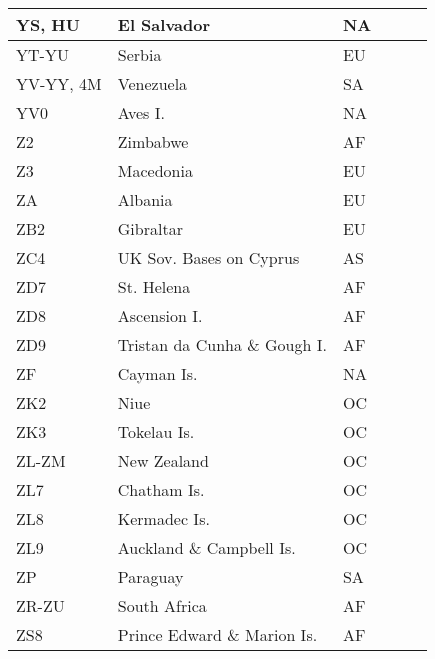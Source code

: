\documentclass[a4paper]{article}
\begin{document}
\begin{longtable}{|p{1.5cm}|p{4cm}|l|p{2cm}|p{2cm}|p{2cm}|}
\hline
YS, HU                 & El Salvador                                & NA    & & & \\
\hline
YT-YU                  & Serbia                                     & EU    & & & \\
\hline
YV-YY, 4M              & Venezuela                                  & SA    & & & \\
\hline
YV0                    & Aves I.                                    & NA    & & & \\
\hline
Z2                     & Zimbabwe                                   & AF    & & & \\
\hline
Z3                     & Macedonia                                  & EU    & & & \\
\hline
ZA                     & Albania                                    & EU    & & & \\
\hline
ZB2                    & Gibraltar                                  & EU    & & & \\
\hline
ZC4                    & UK Sov. Bases on Cyprus                    & AS    & & & \\
\hline
ZD7                    & St. Helena                                 & AF    & & & \\
\hline
ZD8                    & Ascension I.                               & AF    & & & \\
\hline
ZD9                    & Tristan da Cunha \& Gough I.               & AF    & & & \\
\hline
ZF                     & Cayman Is.                                 & NA    & & & \\
\hline
ZK2                    & Niue                                       & OC    & & & \\
\hline
ZK3                    & Tokelau Is.                                & OC    & & & \\
\hline
ZL-ZM                  & New Zealand                                & OC    & & & \\
\hline
ZL7                    & Chatham Is.                                & OC    & & & \\
\hline
ZL8                    & Kermadec Is.                               & OC    & & & \\
\hline
ZL9                    & Auckland \& Campbell Is.                   & OC    & & & \\
\hline
ZP                     & Paraguay                                   & SA    & & & \\
\hline
ZR-ZU                  & South Africa                               & AF    & & & \\
\hline
ZS8                    & Prince Edward \& Marion Is.                & AF    & & & \\
\end{longtable}

\end{document}
